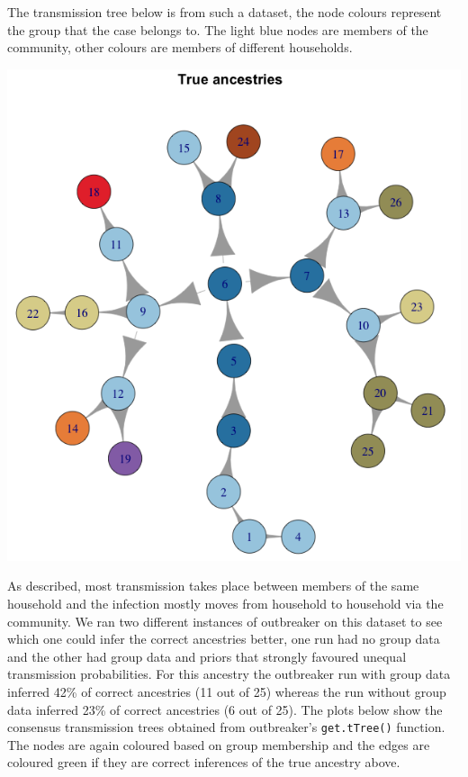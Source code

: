 \documentclass[11pt,a4paper]{report}
\begin{document}
 The transmission tree below is from such a dataset, the node colours represent the group that the case belongs to. The light blue nodes are members of the community, other colours are members of different households.
\begin{center}
\includegraphics[scale=0.5]{ancestree.png}
\end{center}
As described, most transmission takes place between members of the same household and the infection mostly moves from household to household via the community. We ran two different instances of outbreaker on this dataset to see which one could infer the correct ancestries better, one run had no group data and the other had group data and priors that strongly favoured unequal transmission probabilities. For this ancestry the outbreaker run with group data inferred 42\% of correct ancestries (11 out of 25) whereas the run without group data inferred 23\% of correct ancestries (6 out of 25). The plots below show the consensus transmission trees obtained from outbreaker's {\tt get.tTree()} function. The nodes are again coloured based on group membership and the edges are coloured green if they are correct inferences of the true ancestry above.
\end{document}

